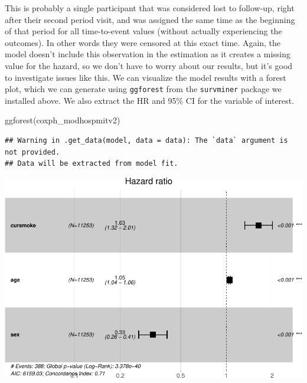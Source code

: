 \documentclass[
]{book}
\newenvironment{Shaded}{\begin{snugshade}}{\end{snugshade}}
\newcommand{\FunctionTok}[1]{\textcolor[rgb]{0.00,0.00,0.00}{#1}}
\newcommand{\NormalTok}[1]{#1}
\begin{document}
This is probably a single participant that was considered lost to follow-up, right after their second period visit, and was assigned the same time as the beginning of that period for all time-to-event values (without actually experiencing the outcomes). In other words they were censored at this exact time. Again, the model doesn't include this observation in the estimation as it creates a missing value for the hazard, so we don't have to worry about our results, but it's good to investigate issues like this. We can visualize the model results with a forest plot, which we can generate using \texttt{ggforest} from the \texttt{survminer} package we installed above. We also extract the HR and 95\% CI for the variable of interest.

\begin{Shaded}
\begin{Highlighting}[]
\FunctionTok{ggforest}\NormalTok{(coxph\_modhospmitv2)}
\end{Highlighting}
\end{Shaded}

\begin{verbatim}
## Warning in .get_data(model, data = data): The `data` argument is not provided.
## Data will be extracted from model fit.
\end{verbatim}

\includegraphics{adv_epi_analysis_files/figure-latex/unnamed-chunk-229-1.pdf}
\end{document}
